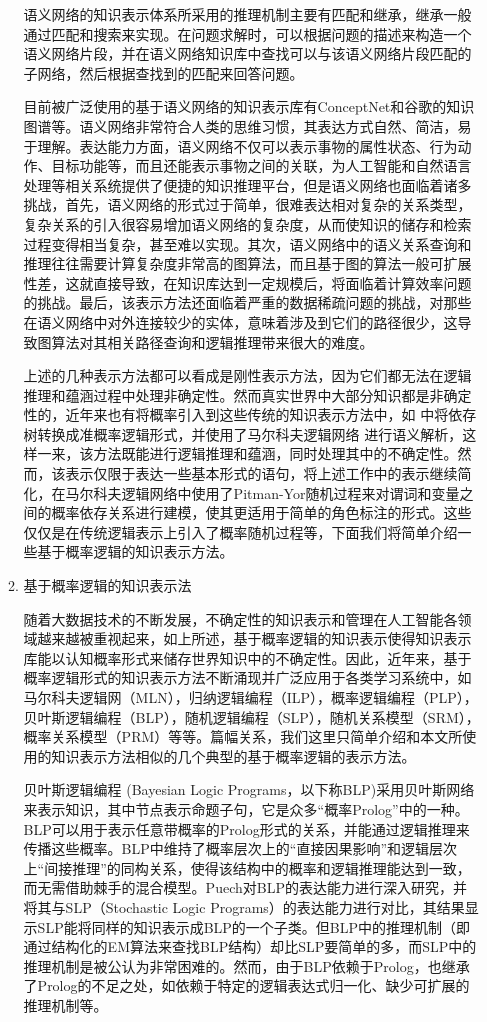 \begin{enumerate}
\begin{enumerate}
语义网络的知识表示体系所采用的推理机制主要有匹配和继承，继承一般通过匹配和搜索来实现。在问题求解时，可以根据问题的描述来构造一个语义网络片段，并在语义网络知识库中查找可以与该语义网络片段匹配的子网络，然后根据查找到的匹配来回答问题。

目前被广泛使用的基于语义网络的知识表示库有ConceptNet\cite{Liu2004}和谷歌的知识图谱等。语义网络非常符合人类的思维习惯，其表达方式自然、简洁，易于理解。表达能力方面，语义网络不仅可以表示事物的属性状态、行为动作、目标功能等，而且还能表示事物之间的关联，为人工智能和自然语言处理等相关系统提供了便捷的知识推理平台，但是语义网络也面临着诸多挑战，首先，语义网络的形式过于简单，很难表达相对复杂的关系类型，复杂关系的引入很容易增加语义网络的复杂度，从而使知识的储存和检索过程变得相当复杂，甚至难以实现。其次，语义网络中的语义关系查询和推理往往需要计算复杂度非常高的图算法，而且基于图的算法一般可扩展性差，这就直接导致，在知识库达到一定规模后，将面临着计算效率问题的挑战。最后，该表示方法还面临着严重的数据稀疏问题的挑战，对那些在语义网络中对外连接较少的实体，意味着涉及到它们的路径很少，这导致图算法对其相关路径查询和逻辑推理带来很大的难度。


上述的几种表示方法都可以看成是刚性表示方法，因为它们都无法在逻辑推理和蕴涵过程中处理非确定性。然而真实世界中大部分知识都是非确定性的，近年来也有将概率引入到这些传统的知识表示方法中，如\cite{Poon2009} 中将依存树转换成准概率逻辑形式，并使用了马尔科夫逻辑网络 \cite{Domingos2007}进行语义解析，这样一来，该方法既能进行逻辑推理和蕴涵，同时处理其中的不确定性。然而，该表示仅限于表达一些基本形式的语句，\cite{Titov2011}将上述工作中的表示继续简化，在马尔科夫逻辑网络中使用了Pitman-Yor随机过程来对谓词和变量之间的概率依存关系进行建模，使其更适用于简单的角色标注的形式。这些仅仅是在传统逻辑表示上引入了概率随机过程等，下面我们将简单介绍一些基于概率逻辑的知识表示方法。

\item {基于概率逻辑的知识表示法}

随着大数据技术的不断发展，不确定性的知识表示和管理在人工智能各领域越来越被重视起来，如上所述，基于概率逻辑的知识表示使得知识表示库能以认知概率形式来储存世界知识中的不确定性。因此，近年来，基于概率逻辑形式的知识表示方法不断涌现并广泛应用于各类学习系统中，如马尔科夫逻辑网（MLN），归纳逻辑编程（ILP），概率逻辑编程（PLP），贝叶斯逻辑编程（BLP），随机逻辑编程（SLP），随机关系模型（SRM），概率关系模型（PRM）等等。篇幅关系，我们这里只简单介绍和本文所使用的知识表示方法相似的几个典型的基于概率逻辑的表示方法。

      贝叶斯逻辑编程 (Bayesian Logic Programs，以下称BLP)\cite{Kersting2007}采用贝叶斯网络来表示知识，其中节点表示命题子句，它是众多“概率Prolog”中的一种。BLP可以用于表示任意带概率的Prolog形式的关系，并能通过逻辑推理来传播这些概率。BLP中维持了概率层次上的“直接因果影响”和逻辑层次上“间接推理”的同构关系，使得该结构中的概率和逻辑推理能达到一致，而无需借助棘手的混合模型。Puech\cite{Puech2003}对BLP的表达能力进行深入研究，并将其与SLP（Stochastic Logic Programs）的表达能力进行对比，其结果显示SLP能将同样的知识表示成BLP的一个子类。但BLP中的推理机制（即通过结构化的EM算法来查找BLP结构）却比SLP要简单的多，而SLP中的推理机制是被公认为非常困难的\cite{DaRaett2003}。然而，由于BLP依赖于Prolog，也继承了Prolog的不足之处，如依赖于特定的逻辑表达式归一化、缺少可扩展的推理机制等。
     

\end{enumerate}
\end{enumerate}
